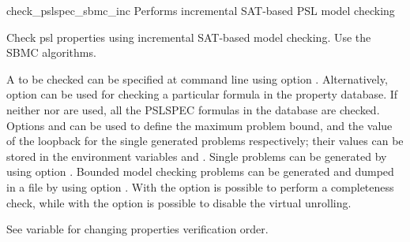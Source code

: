 \begin{nusmvCommand}{check\_pslspec\_sbmc\_inc} {Performs incremental SAT-based PSL model checking}


Check psl properties using incremental SAT-based model checking. Use the SBMC
algorithms.

A \pslexpr to be checked can be specified at command line using option
. Alternatively, option  can be used for checking a
particular formula in the property database. If neither  nor
 are used, all the PSLSPEC formulas in the database are
checked. Options  and  can be used to define the
maximum problem bound, and the value of the loopback for the single generated
problems respectively; their values can be stored in the environment variables
 and . Single problems can be
generated by using option . Bounded model checking problems can
be generated and dumped in a file by using option . With the
option  is possible to perform a completeness check, while with
the option  is possible to disable the virtual unrolling.

See variable  for changing properties
verification order.

\begin{cmdOpt}





\end{cmdOpt}
\end{nusmvCommand}
